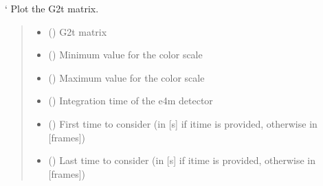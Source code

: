 \documentclass[letterpaper,10pt,english]{sphinxmanual}
\begin{document}

\begin{fulllineitems}
\label{\detokenize{index:XPCS_tools.plot_G2t}}
\pysigstartsignatures
\pysiglinewithargsret
{}
{\sphinxparamcomma {}\sphinxparamcomma {}\sphinxparamcomma {}\sphinxparamcomma {}\sphinxparamcomma {}\sphinxparamcomma {}\sphinxparamcomma {}\sphinxparamcomma {}\sphinxparamcomma {}}
{}
\pysigstopsignatures
\sphinxAtStartPar
‘
Plot the G2t matrix.
\begin{quote}\begin{description}
\begin{itemize}
\item {} 
\sphinxAtStartPar
{} () \textendash{} G2t matrix

\item {} 
\sphinxAtStartPar
{} () \textendash{} Minimum value for the color scale

\item {} 
\sphinxAtStartPar
{} () \textendash{} Maximum value for the color scale

\item {} 
\sphinxAtStartPar
{} () \textendash{} Integration time of the e4m detector

\item {} 
\sphinxAtStartPar
{} () \textendash{} First time to consider (in {[}s{]} if itime is provided, otherwise in {[}frames{]})

\item {} 
\sphinxAtStartPar
{} () \textendash{} Last time to consider (in {[}s{]} if itime is provided, otherwise in {[}frames{]})


\end{itemize}
\end{description}
\end{quote}
\end{fulllineitems}
\end{document}
